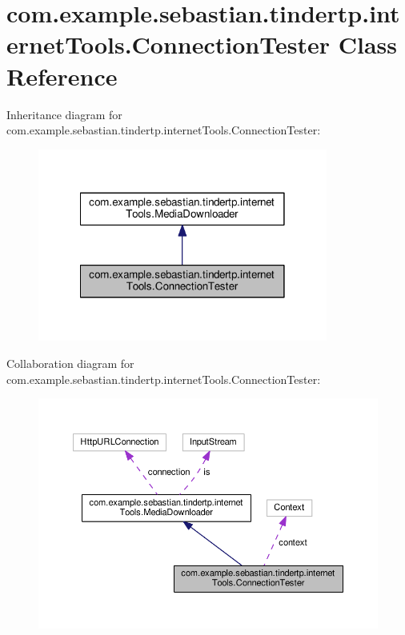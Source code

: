 \hypertarget{classcom_1_1example_1_1sebastian_1_1tindertp_1_1internetTools_1_1ConnectionTester}{}\section{com.\+example.\+sebastian.\+tindertp.\+internet\+Tools.\+Connection\+Tester Class Reference}
\label{classcom_1_1example_1_1sebastian_1_1tindertp_1_1internetTools_1_1ConnectionTester}


Inheritance diagram for com.\+example.\+sebastian.\+tindertp.\+internet\+Tools.\+Connection\+Tester\+:\nopagebreak
\begin{figure}[H]
\begin{center}
\leavevmode
\includegraphics[width=270pt]{classcom_1_1example_1_1sebastian_1_1tindertp_1_1internetTools_1_1ConnectionTester__inherit__graph}
\end{center}
\end{figure}


Collaboration diagram for com.\+example.\+sebastian.\+tindertp.\+internet\+Tools.\+Connection\+Tester\+:\nopagebreak
\begin{figure}[H]
\begin{center}
\leavevmode
\includegraphics[width=350pt]{classcom_1_1example_1_1sebastian_1_1tindertp_1_1internetTools_1_1ConnectionTester__coll__graph}
\end{center}
\end{figure}
